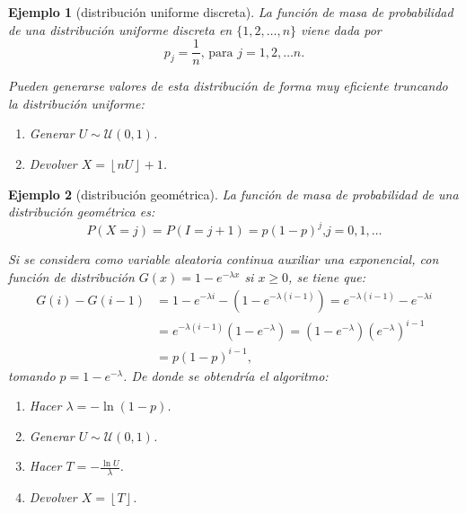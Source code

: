 \documentclass[
]{book}
\theoremstyle{break}
\newtheorem{example}{Ejemplo}[chapter]
\theoremstyle{nonumberplain}
\begin{document}
\begin{example}[distribución uniforme discreta]

La función de masa de probabilidad de una distribución uniforme discreta
en \(\{1,2,\ldots,n\}\) viene dada por
\[p_{j}=\frac{1}{n}\text{, para }j=1,2,\ldots n.\]

Pueden generarse valores de esta distribución de forma muy eficiente
truncando la distribución uniforme:

\begin{enumerate}
\def\labelenumi{\arabic{enumi}.}
\item
  Generar \(U\sim \mathcal{U}\left( 0,1\right)\).
\item
  Devolver \(X=\left\lfloor nU\right\rfloor + 1\).
\end{enumerate}

\end{example}

\begin{example}[distribución geométrica]

La función de masa de probabilidad de una distribución geométrica es:
\[P\left( X=j\right)  =P\left( I=j+1\right)  =p\left( 1-p\right)^{j}\text{,
}j=0,1,\ldots\]

Si se considera como variable aleatoria continua auxiliar una
exponencial, con función de distribución
\(G\left( x\right) = 1-e^{-\lambda x}\) si \(x\geq0\),
se tiene que:
\[\begin{aligned}
G\left( i\right) - G\left( i-1\right)   
& = 1-e^{-\lambda i}-\left(1-e^{-\lambda\left( i-1\right) }\right)  
= e^{-\lambda\left( i-1\right)}-e^{-\lambda i}\\
& = e^{-\lambda\left( i-1\right)  }\left( 1-e^{-\lambda}\right)  
= \left( 1-e^{-\lambda}\right)  \left( e^{-\lambda}\right)^{i-1} \\
& = p\left(1-p\right)^{i-1},
\end{aligned}\]
tomando \(p=1-e^{-\lambda}\).
De donde se obtendría el algoritmo:

\begin{enumerate}
\def\labelenumi{\arabic{enumi}.}
\setcounter{enumi}{-1}
\item
  Hacer \(\lambda=-\ln\left( 1-p\right)\).
\item
  Generar \(U\sim \mathcal{U}\left( 0,1\right)\).
\item
  Hacer \(T=-\frac{\ln U}{\lambda}\).
\item
  Devolver \(X=\left\lfloor T\right\rfloor\).
\end{enumerate}

\end{example}
\end{document}
